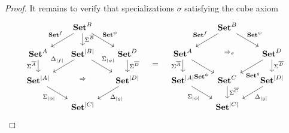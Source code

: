 \documentclass[11pt, oneside, article]{memoir}
\theoremstyle{plain}
\theoremstyle{definition}
\theoremstyle{remark}
\DeclarePairedDelimiter{\abs}{\lvert}{\rvert}
\newcommand{\namedcat}[1]{\mathbf{#1}}
\newcommand{\cat}[1]{\mathbf{#1}}
\newcommand{\Set}{\namedcat{Set}}
\newcommand{\CoalgOn}[2]{{#2}^{#1}}
\newcommand{\CoalgSet}[1]{\CoalgOn{#1}{\Set}}
\newcommand{\clift}[1]{\overline{#1}}
\newcommand{\pts}[1]{{\abs{#1}}}
\newcommand{\one}[1]{\pts{#1}}
\newcommand{\carr}{\Sigma}
\newcommand{\leindex}[1]{\Sigma_{#1}}
\newcommand{\reindex}[1]{\Delta_{#1}}
\newcommand{\car}[1]{\carr^{#1}}
\newcommand{\com}[2]{{#1}^{#2}}
\newcommand{\con}[2]{{#1}^{#2}}
\newcommand{\cmnd}[1]{{#1}}
\newcommand{\cA}{\cmnd{A}}
\newcommand{\cB}{\cmnd{B}}
\newcommand{\cC}{\cmnd{C}}
\newcommand{\cD}{\cmnd{D}}
\newcommand{\bB}{\cat{B}}
\newcommand{\ASet}{\CoalgSet{\cA}}
\newcommand{\BSet}{\CoalgSet{\cB}}
\newcommand{\CSet}{\CoalgSet{\cC}}
\newcommand{\DSet}{\CoalgSet{\cD}}
\newcommand{\SetpA}{\Set^\pts{\cA}}
\newcommand{\SetpB}{\Set^\pts{\cB}}
\newcommand{\SetpC}{\Set^\pts{\cC}}
\newcommand{\SetpD}{\Set^\pts{\cD}}
\begin{document}
\begin{proof}
  It remains to verify that specializations $\sigma$
  satisfying the cube axiom
  \[
    \begin{tikzcd}[column sep=17, row sep=15]
      & \BSet & \\
      \ASet & \SetpB & \DSet \\
      \SetpA && \SetpD \\
      & \SetpC
      \arrow["{\con{\Set}{f}}"'{pos=0.4}, from=1-2, to=2-1]
      \arrow["\car{\clift{\cB}}"{pos=0.4}, from=1-2, to=2-2]
      \arrow["{\com{\Set}{\psi}}"{pos=0.4}, from=1-2, to=2-3]
      \arrow["\car{\clift{\cA}}"'{pos=0.4}, from=2-1, to=3-1]
      \arrow["{\reindex{\one{f}}}"'{pos=0.4}, from=2-2, to=3-1]
      \arrow["{\leindex{\one{\psi}}}"{pos=0.4}, from=2-2, to=3-3]
      \arrow["\Rightarrow"{description}, draw=none, from=2-2, to=4-2]
      \arrow["\car{\clift{\cD}}"{pos=0.4}, from=2-3, to=3-3]
      \arrow["{\leindex{\one{\phi}}}"', from=3-1, to=4-2]
      \arrow["{\reindex{\one{g}}}", from=3-3, to=4-2]
    \end{tikzcd}
    \;\;\; = \;\;\;
    \begin{tikzcd}[column sep=17, row sep=15]
      & \BSet & \\
      \ASet && \DSet \\
      \SetpA & \CSet & \SetpD \\
      & \SetpC
      \arrow["{\con{\Set}{f}}"'{pos=0.4}, from=1-2, to=2-1]
      \arrow["{\com{\Set}{\psi}}"{pos=0.4}, from=1-2, to=2-3]
      \arrow["{\Rightarrow_\sigma}"{description}, shift left, draw=none, from=1-2, to=3-2]
      \arrow["\car{\clift{\cA}}"'{pos=0.4}, from=2-1, to=3-1]
      \arrow["{\com{\Set}{\phi}}"'{pos=0.85}, from=2-1, to=3-2]
      \arrow["{\con{\Set}{g}}"{pos=0.85}, from=2-3, to=3-2]
      \arrow["\car{\clift{\cD}}"{pos=0.4}, from=2-3, to=3-3]
      \arrow["{\leindex{\one{\phi}}}"', from=3-1, to=4-2]
      \arrow["\car{\clift{\cC}}"{pos=0.4}, from=3-2, to=4-2]
      \arrow["{\reindex{\one{g}}}", from=3-3, to=4-2]
    \end{tikzcd}
  \]

\end{proof}
\end{document}

